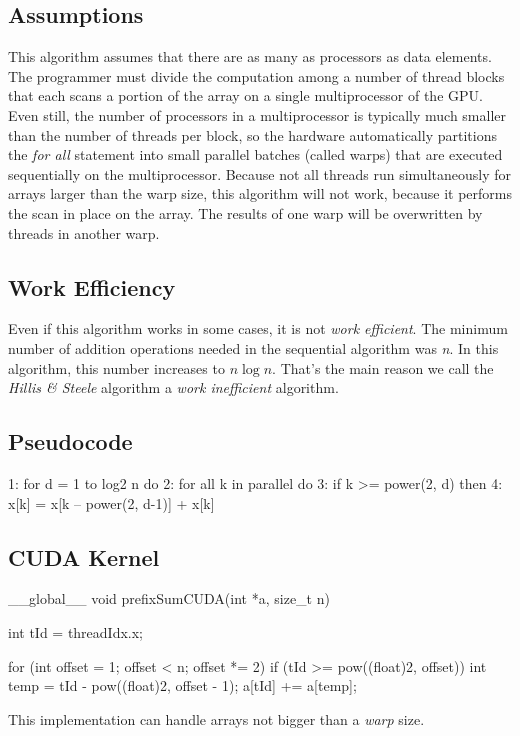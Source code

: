 \documentclass[12pt]{article}
\numberwithin{equation}{section}
\numberwithin{table}{section}
\numberwithin{figure}{section}
\begin{document}
\subsection{Assumptions}
This algorithm assumes that there are as many as processors as data elements. The programmer must divide the computation among a number of thread blocks that each scans a portion of the array on a single multiprocessor of the GPU. Even still, the number of processors in a multiprocessor is typically much smaller than the number of threads per block, so the hardware automatically partitions the \textit{for all} statement into small parallel batches (called warps) that are executed sequentially on the multiprocessor. Because not all threads run simultaneously for arrays larger than the warp size, this algorithm will not work, because it performs the scan in place on the array. The results of one warp will be overwritten by threads in another warp.

\subsection{Work Efficiency}
Even if this algorithm works in some cases, it is not \textit{work efficient}. The minimum number of addition operations needed in the sequential algorithm was \textit{n}. In this algorithm, this number increases to $n\log n$. That's the main reason we call the \textit{Hillis \& Steele} algorithm a \textit{work inefficient} algorithm.
\subsection{Pseudocode}
\begin{cpp}
	1: for d = 1 to log2 n do
	2:     for all k in parallel do
	3:          if k >= power(2, d)  then
	4:              x[k] = x[k – power(2, d-1)] + x[k]
\end{cpp}

\subsection{CUDA Kernel}
\begin{cpp}
	__global__ void
	prefixSumCUDA(int *a, size_t n)
	{
		
		int tId = threadIdx.x;
		
		for (int offset = 1; offset < n; offset *= 2) {
			if (tId >= pow((float)2, offset)) {
				int temp = tId - pow((float)2, offset - 1);
				a[tId] += a[temp];
			}
		}
	}
\end{cpp}
This implementation can handle arrays not bigger than a \textit{warp} size.
\end{document}
